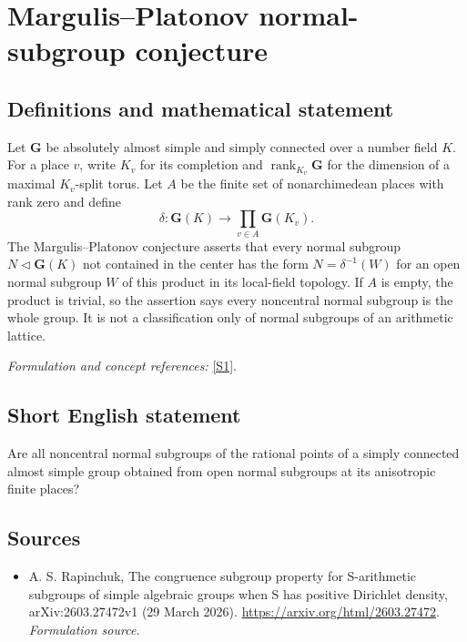 \documentclass[11pt]{article}
\begin{document}
\section*{\texorpdfstring{Margulis–Platonov normal-subgroup conjecture}{Margulis–Platonov normal-subgroup conjecture}}\label{394}
\subsection{Definitions and mathematical statement}
Let $\mathbf G$ be absolutely almost simple and simply connected over a number field $K$. For a place $v$, write $K_v$ for its completion and $\operatorname{rank}_{K_v}\mathbf G$ for the dimension of a maximal $K_v$-split torus. Let $A$ be the finite set of nonarchimedean places with rank zero and define
\[
 \delta:\mathbf G(K)\longrightarrow\prod_{v\in A}\mathbf G(K_v).
\]
The Margulis--Platonov conjecture asserts that every normal subgroup $N\triangleleft\mathbf G(K)$ not contained in the center has the form $N=\delta^{-1}(W)$ for an open normal subgroup $W$ of this product in its local-field topology. If $A$ is empty, the product is trivial, so the assertion says every noncentral normal subgroup is the whole group. It is not a classification only of normal subgroups of an arithmetic lattice.
\par\smallskip\textit{Formulation and concept references:} \href{https://arxiv.org/html/2603.27472}{[S1]}.

\subsection{Short English statement}
Are all noncentral normal subgroups of the rational points of a simply connected almost simple group obtained from open normal subgroups at its anisotropic finite places?
\subsection{Sources}
\begin{itemize}
\item[S1]A. S. Rapinchuk, The congruence subgroup property for S-arithmetic subgroups of simple algebraic groups when S has positive Dirichlet density, arXiv:2603.27472v1 (29 March 2026).
\url{https://arxiv.org/html/2603.27472}.
\textit{Formulation source.}
\end{itemize}
\end{document}

